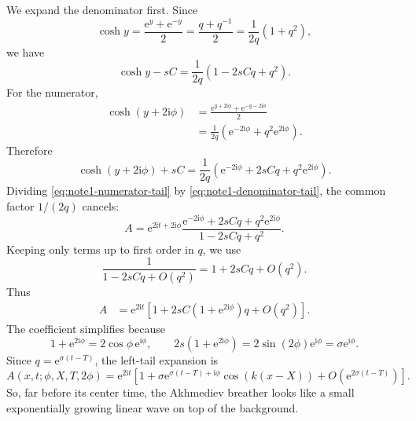 \documentclass{amsart}
\newcounter{note}
\numberwithin{equation}{hw}
\begin{document}
We expand the denominator first.  Since
\begin{equation}
\cosh y
=
\frac{\mathrm{e}^y+\mathrm{e}^{-y}}{2}
=
\frac{q+q^{-1}}{2}
=
\frac{1}{2q}\left(1+q^2\right),
\label{eq:note1-cosh-y-expand}
\end{equation}
we have
\begin{equation}
\cosh y-sC
=
\frac{1}{2q}
\left(
1-2sCq+q^2
\right).
\label{eq:note1-denominator-tail}
\end{equation}
For the numerator,
\begin{align}
\cosh(y+2\mathrm{i}\phi)
&=
\frac{
\mathrm{e}^{y+2\mathrm{i}\phi}
+
\mathrm{e}^{-y-2\mathrm{i}\phi}
}{2}
\nonumber\\
&=
\frac{1}{2q}
\left(
\mathrm{e}^{-2\mathrm{i}\phi}
+
q^2\mathrm{e}^{2\mathrm{i}\phi}
\right).
\label{eq:note1-cosh-shift-expand}
\end{align}
Therefore
\begin{equation}
\cosh(y+2\mathrm{i}\phi)+sC
=
\frac{1}{2q}
\left(
\mathrm{e}^{-2\mathrm{i}\phi}
+
2sCq
+
q^2\mathrm{e}^{2\mathrm{i}\phi}
\right).
\label{eq:note1-numerator-tail}
\end{equation}
Dividing \eqref{eq:note1-numerator-tail} by
\eqref{eq:note1-denominator-tail}, the common factor \(1/(2q)\) cancels:
\begin{equation}
A
=
\mathrm{e}^{2\mathrm{i}t+2\mathrm{i}\phi}
\frac{
\mathrm{e}^{-2\mathrm{i}\phi}
+
2sCq
+
q^2\mathrm{e}^{2\mathrm{i}\phi}
}{
1-2sCq+q^2
}.
\label{eq:note1-tail-ratio-before}
\end{equation}
Keeping only terms up to first order in \(q\), we use
\[
\frac{1}{1-2sCq+O(q^2)}
=
1+2sCq+O(q^2).
\]
Thus
\begin{align}
A
&=
\mathrm{e}^{2\mathrm{i}t}
\left[
1
+
2sC\left(1+\mathrm{e}^{2\mathrm{i}\phi}\right)q
+
O(q^2)
\right].
\label{eq:note1-tail-pre-coefficient}
\end{align}
The coefficient simplifies because
\begin{equation}
1+\mathrm{e}^{2\mathrm{i}\phi}
=
2\cos\phi\,\mathrm{e}^{\mathrm{i}\phi},
\qquad
2s\left(1+\mathrm{e}^{2\mathrm{i}\phi}\right)
=
2\sin(2\phi)\mathrm{e}^{\mathrm{i}\phi}
=
\sigma\mathrm{e}^{\mathrm{i}\phi}.
\label{eq:note1-tail-coefficient-simplify}
\end{equation}
Since \(q=\mathrm{e}^{\sigma(t-T)}\), the left-tail expansion is
\begin{equation}
A(x,t;\phi,X,T,2\phi)
=
\mathrm{e}^{2\mathrm{i}t}
\left[
1
+
\sigma
\mathrm{e}^{\sigma(t-T)+\mathrm{i}\phi}
\cos\!\left(k(x-X)\right)
+
O\!\left(\mathrm{e}^{2\sigma(t-T)}\right)
\right].
\label{eq:note1-akhmediev-left-tail}
\end{equation}
So, far before its center time, the Akhmediev breather looks like a small
exponentially growing linear wave on top of the background.
\end{document}
